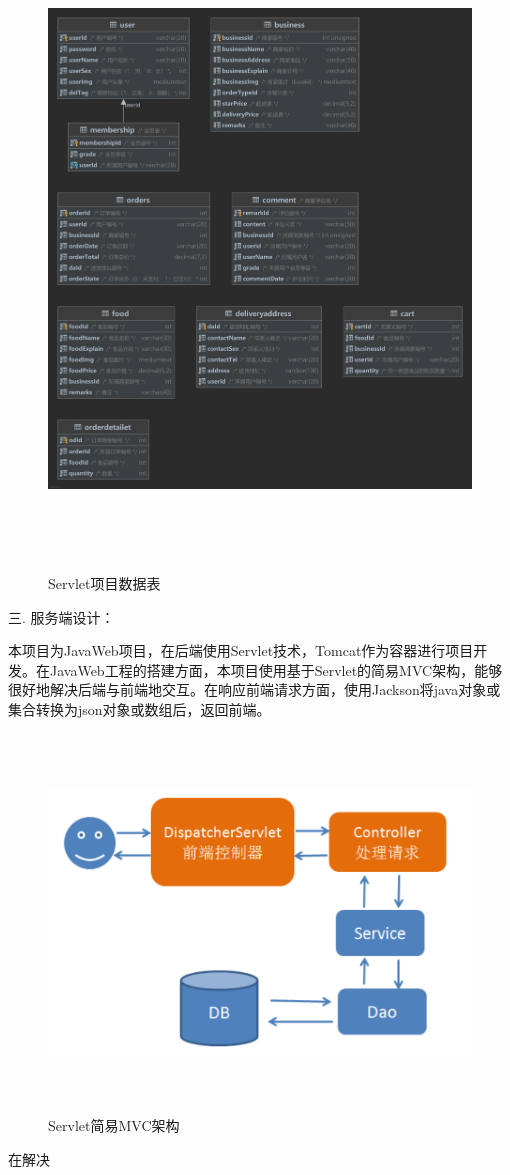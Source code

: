 \begin{figure}[H]
    \centering
    \includegraphics[width=15cm,height=17cm]{figures/table2.jpg}
    \caption{Servlet项目数据表}
    \end{figure}

\noindent
三. 服务端设计：

本项目为JavaWeb项目，在后端使用Servlet技术，Tomcat作为容器进行项目开发。在JavaWeb工程的搭建方面，本项目使用基于Servlet的简易MVC架构，能够很好地解决后端与前端地交互。在响应前端请求方面，使用Jackson将java对象或集合转换为json对象或数组后，返回前端。

\begin{figure}[H]
    \centering
    \includegraphics[width=15cm,height=10cm]{figures/MVC.png}
    \caption{Servlet简易MVC架构}
    \end{figure}

在解决



